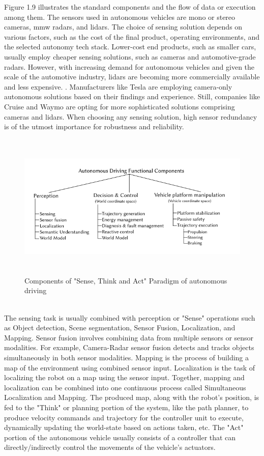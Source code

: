 Figure 1.9 illustrates the standard components and the flow of data or execution among them. The sensors used in autonomous vehicles are mono or stereo cameras, mmw radars, and lidars. The choice of sensing solution depends on various factors, such as the cost of the final product, operating environments, and the selected autonomy tech stack. Lower-cost end products, such as smaller cars, usually employ cheaper sensing solutions, such as cameras and automotive-grade radars. However, with increasing demand for autonomous vehicles and given the scale of the automotive industry, lidars are becoming more commercially available and less expensive. \cite{okuda2014survey}. Manufacturers like Tesla are employing camera-only autonomous solutions based on their findings and experience. Still, companies like Cruise and Waymo are opting for more sophisticated solutions comprising cameras and lidars. When choosing any sensing solution, high sensor redundancy is of the utmost importance for robustness and reliability.
\cite{okuda2014survey}
\begin{figure}[H]
    \centering
    \includegraphics[width=\textwidth,height=7cm,keepaspectratio=true]{src/Images/auv_comp.PNG}
    \caption{
      Components of "Sense, Think and Act" Paradigm of autonomous driving \cite{behere2015functional}
    }
\end{figure}
\\
 The sensing task is usually combined with perception or "Sense" operations such as Object detection, Scene segmentation, Sensor Fusion, Localization, and Mapping. Sensor fusion involves combining data from multiple sensors or sensor modalities. For example, Camera-Radar sensor fusion detects and tracks objects simultaneously in both sensor modalities. Mapping is the process of building a map of the environment using combined sensor input. Localization is the task of localizing the robot on a map using the sensor input. Together,  mapping and localization can be combined into one continuous process called Simultaneous Localization and Mapping. The produced map, along with the robot's position, is fed to the "Think" or planning portion of the system, like the path planner, to produce velocity commands and trajectory for the controller unit to execute, dynamically updating the world-state based on actions taken, etc. The "Act" portion of the autonomous vehicle usually consists of a controller that can directly/indirectly control the movements of the vehicle's actuators. \cite{behere2015functional}
